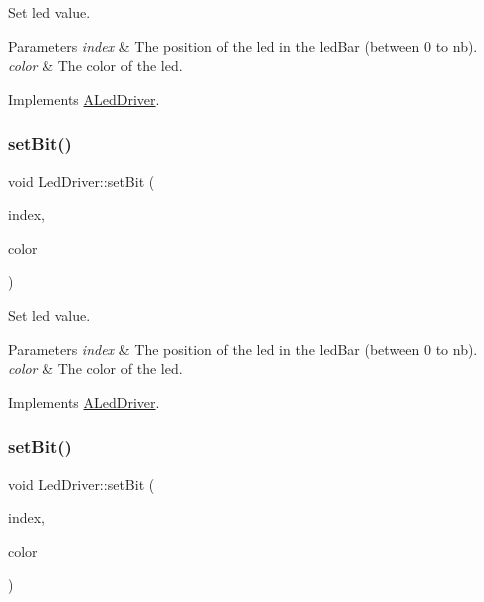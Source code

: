 Set led value. 


\begin{DoxyParams}{Parameters}
{\em index} & The position of the led in the led\+Bar (between 0 to nb). \\
\hline
{\em color} & The color of the led. \\
\hline
\end{DoxyParams}


Implements \hyperlink{classALedDriver_acbc8507c36f0f4fa3afb845d81e56eb2}{A\+Led\+Driver}.

\mbox{\label{classLedDriver_af5ec63943cb92b14a887fdd2a5491e93}} 
\subsubsection{\texorpdfstring{set\+Bit()}{setBit()}\hspace{0.1cm}{\footnotesize\ttfamily [2/5]}}
{\footnotesize\ttfamily void Led\+Driver\+::set\+Bit (\begin{DoxyParamCaption}\item[{int}]{index,  }\item[{Led\+Color}]{color }\end{DoxyParamCaption})\hspace{0.3cm}{\ttfamily [virtual]}}



Set led value. 


\begin{DoxyParams}{Parameters}
{\em index} & The position of the led in the led\+Bar (between 0 to nb). \\
\hline
{\em color} & The color of the led. \\
\hline
\end{DoxyParams}


Implements \hyperlink{classALedDriver_acbc8507c36f0f4fa3afb845d81e56eb2}{A\+Led\+Driver}.

\mbox{\label{classLedDriver_a1856fb030d88bcacdc37dfce7f0f8136}} 
\subsubsection{\texorpdfstring{set\+Bit()}{setBit()}\hspace{0.1cm}{\footnotesize\ttfamily [3/5]}}
{\footnotesize\ttfamily void Led\+Driver\+::set\+Bit (\begin{DoxyParamCaption}\item[{int}]{index,  }\item[{Led\+Color}]{color }\end{DoxyParamCaption})\hspace{0.3cm}{\ttfamily [virtual]}}



